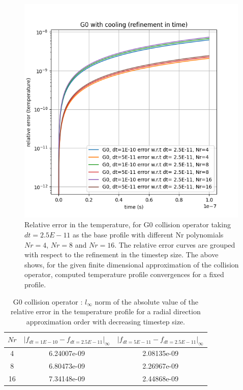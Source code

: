 \documentclass{article}
\begin{document}
\begin{figure}[H]
    \centering
    \includegraphics[width=0.99\textwidth]{dat/g0_dt.png}
    \caption{Relative error in the temperature, for G0 collision operator taking $dt=2.5E-11$ as the base profile with different Nr polynomials $Nr=4$, $Nr=8$ and $Nr=16$. The relative error curves are grouped with respect to the refinement in the timestep size. The above shows, for the given finite dimensional approximation of the collision operator, computed temperature profile convergences for a fixed profile.}
\end{figure}

\begin{table}[H]
    \centering
    \begin{tabular}{|c|c|c|}
        \hline
        $Nr$ & $|f_{dt=1E-10}-f_{dt=2.5E-11}|_\infty$ & $|f_{dt=5E-11}-f_{dt=2.5E-11}|_\infty$ \\
        \hline
        4          & 6.24007e-09         & 2.08135e-09 \\
        8          & 6.80473e-09         & 2.26967e-09 \\
        16         & 7.34148e-09         & 2.44868e-09 \\
        \hline
    \end{tabular}
    \caption{G0 collision operator : $l_\infty$ norm of the absolute value of the relative error in the temperature profile for a radial direction approximation order with decreasing timestep size. }
\end{table}
\end{document}
